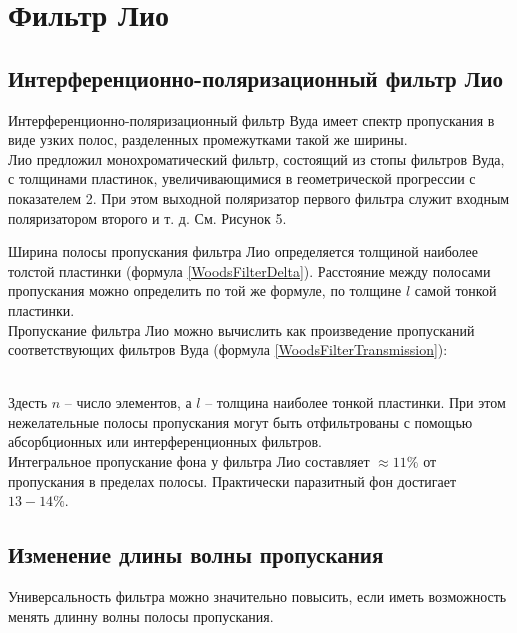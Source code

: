 

\section{Фильтр Лио}

\subsection{Интерференционно-поляризационный фильтр Лио}

Интерференционно-поляризационный фильтр Вуда имеет спектр пропускания в виде узких полос,
разделенных промежутками такой же ширины. \\

Лио предложил монохроматический фильтр, состоящий из стопы фильтров Вуда, с толщинами
пластинок, увеличивающимися в геометрической прогрессии с показателем 2. При этом
выходной поляризатор первого фильтра служит входным поляризатором второго и т. д. См.
Рисунок 5.


Ширина полосы пропускания фильтра Лио определяется толщиной наиболее толстой пластинки
(формула \ref{WoodsFilterDelta}). Расстояние между полосами пропускания можно определить
по той же формуле, по толщине $ l $ самой тонкой пластинки. \\

Пропускание фильтра Лио можно вычислить как произведение пропусканий соответствующих
фильтров Вуда (формула \ref{WoodsFilterTransmission}):

 \\

Здесть $ n $ -- число элементов, а $ l $ -- толщина наиболее тонкой пластинки. При этом
нежелательные полосы пропускания могут быть отфильтрованы с помощью абсорбционных или
интерференционных фильтров. \\

Интегральное пропускание фона у фильтра Лио составляет $ \approx 11\% $ от пропускания
в пределах полосы. Практически паразитный фон достигает $ 13 - 14\% $.

\subsection{Изменение длины волны пропускания}

Универсальность фильтра можно значительно повысить, если иметь возможность менять
длинну волны полосы пропускания. \\

